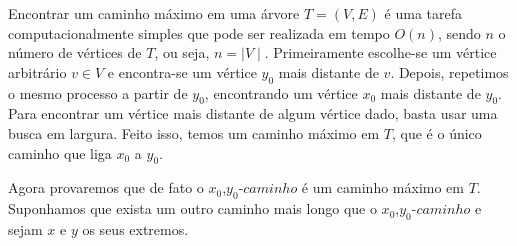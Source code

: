 \documentclass[a4paper,12pt]{article}
\begin{document}
	Encontrar um caminho máximo em uma árvore $T=(V,E)$ é uma tarefa
	computacionalmente simples que pode ser realizada em tempo 
	$O(n)$, sendo $n$ o número de vértices de $T$, ou seja, 
	$n = \mid V\mid$. 
	Primeiramente escolhe-se um vértice arbitrário
	$v \in V$ e encontra-se um vértice $y_0$ mais distante de 
	$v$.
	Depois, repetimos o mesmo processo a partir de $y_0$, 
	encontrando um vértice
	$x_0$ mais distante de $y_0$. 
	Para encontrar um vértice mais distante de algum vértice dado, 
	basta usar uma busca em largura.  
	Feito isso, temos um caminho máximo em $T$, que é o único
	caminho que liga $x_0$ a $y_0$.


	Agora provaremos que de fato o $x_0$,$y_0$-$caminho$ é um caminho 
	máximo em $T$.
	Suponhamos que exista um outro caminho mais longo que o
	$x_0$,$y_0$-$caminho$ e sejam $x$ e $y$ os seus extremos.
\end{document}
